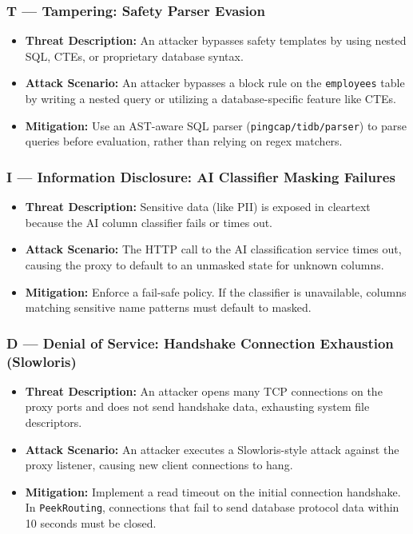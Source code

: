 \subsubsection{T --- Tampering: Safety Parser Evasion}
\begin{itemize}[leftmargin=*]
    \item \textbf{Threat Description:} An attacker bypasses safety templates by using nested SQL, CTEs, or proprietary database syntax.
    \item \textbf{Attack Scenario:} An attacker bypasses a block rule on the \texttt{employees} table by writing a nested query or utilizing a database-specific feature like CTEs.
    \item \textbf{Mitigation:} Use an AST-aware SQL parser (\texttt{pingcap/tidb/parser}) to parse queries before evaluation, rather than relying on regex matchers.
\end{itemize}

\subsubsection{I --- Information Disclosure: AI Classifier Masking Failures}
\begin{itemize}[leftmargin=*]
    \item \textbf{Threat Description:} Sensitive data (like PII) is exposed in cleartext because the AI column classifier fails or times out.
    \item \textbf{Attack Scenario:} The HTTP call to the AI classification service times out, causing the proxy to default to an unmasked state for unknown columns.
    \item \textbf{Mitigation:} Enforce a fail-safe policy. If the classifier is unavailable, columns matching sensitive name patterns must default to masked.
\end{itemize}

\subsubsection{D --- Denial of Service: Handshake Connection Exhaustion (Slowloris)}
\begin{itemize}[leftmargin=*]
    \item \textbf{Threat Description:} An attacker opens many TCP connections on the proxy ports and does not send handshake data, exhausting system file descriptors.
    \item \textbf{Attack Scenario:} An attacker executes a Slowloris-style attack against the proxy listener, causing new client connections to hang.
    \item \textbf{Mitigation:} Implement a read timeout on the initial connection handshake. In \texttt{PeekRouting}, connections that fail to send database protocol data within 10 seconds must be closed.
\end{itemize}

